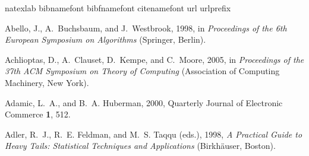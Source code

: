\documentclass[final]{siamltex}
\begin{document}

\begin{thebibliography}{63}
\expandafter\ifx\csname natexlab\endcsname\relax\def\natexlab#1{#1}\fi
\expandafter\ifx\csname bibnamefont\endcsname\relax
 \def\bibnamefont#1{#1}\fi
\expandafter\ifx\csname bibfnamefont\endcsname\relax
 \def\bibfnamefont#1{#1}\fi
\expandafter\ifx\csname citenamefont\endcsname\relax
 \def\citenamefont#1{#1}\fi
\expandafter\ifx\csname url\endcsname\relax
 \def\url#1{\texttt{#1}}\fi
\expandafter\ifx\csname urlprefix\endcsname\relax\def\urlprefix{URL }\fi
\providecommand{\bibinfo}[2]{#2}
\providecommand{\eprint}[2][]{\url{#2}}

\bibinfo{author}{\bibnamefont{Abello}, \bibfnamefont{J.}},
 \bibinfo{author}{\bibfnamefont{A.}~\bibnamefont{Buchsbaum}}, and
 \bibinfo{author}{\bibfnamefont{J.}~\bibnamefont{Westbrook}},
 \bibinfo{year}{1998}, in \emph{\bibinfo{booktitle}{Proceedings of the 6th
 European Symposium on Algorithms}} (\bibinfo{publisher}{Springer},
 \bibinfo{address}{Berlin}).

\bibinfo{author}{\bibnamefont{Achlioptas}, \bibfnamefont{D.}},
 \bibinfo{author}{\bibfnamefont{A.}~\bibnamefont{Clauset}},
 \bibinfo{author}{\bibfnamefont{D.}~\bibnamefont{Kempe}}, and
 \bibinfo{author}{\bibfnamefont{C.}~\bibnamefont{Moore}},
 \bibinfo{year}{2005}, in \emph{\bibinfo{booktitle}{Proceedings of the 37th
 ACM Symposium on Theory of Computing}} (\bibinfo{publisher}{Association of
 Computing Machinery}, \bibinfo{address}{New York}).

\bibinfo{author}{\bibnamefont{Adamic}, \bibfnamefont{L.~A.}}, and
 \bibinfo{author}{\bibfnamefont{B.~A.} \bibnamefont{Huberman}},
 \bibinfo{year}{2000}, \bibinfo{journal}{Quarterly Journal of Electronic
 Commerce} \textbf{\bibinfo{volume}{1}}, \bibinfo{pages}{512}.

\bibinfo{editor}{\bibnamefont{Adler}, \bibfnamefont{R.~J.}},
 \bibinfo{editor}{\bibfnamefont{R.~E.} \bibnamefont{Feldman}}, and
 \bibinfo{editor}{\bibfnamefont{M.~S.} \bibnamefont{Taqqu}} (eds.),
 \bibinfo{year}{1998}, \emph{\bibinfo{title}{A Practical Guide to Heavy Tails:
 Statistical Techniques and Applications}}
 (\bibinfo{publisher}{Birkh{\"a}user}, \bibinfo{address}{Boston}).


\end{thebibliography}
\end{document}
